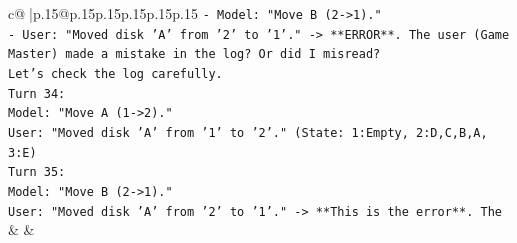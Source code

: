 \documentclass{article}
\begin{document}
{\begin{supertabular}{c@{$\;$}|p{.15\linewidth}@{}p{.15\linewidth}p{.15\linewidth}p{.15\linewidth}p{.15\linewidth}p{.15\linewidth}}
{{{\texttt{{-} Model: "Move B (2{-}>1)."} \\
\texttt{{-} User: "Moved disk 'A' from '2' to '1'." {-}> **ERROR**. The user (Game Master) made a mistake in the log? Or did I misread?} \\
\texttt{Let's check the log carefully.} \\
\texttt{Turn 34:} \\
\texttt{Model: "Move A (1{-}>2)."} \\
\texttt{User: "Moved disk 'A' from '1' to '2'." (State: 1:Empty, 2:D,C,B,A, 3:E)} \\
\texttt{Turn 35:} \\
\texttt{Model: "Move B (2{-}>1)."} \\
\texttt{User: "Moved disk 'A' from '2' to '1'." {-}> **This is the error**. The} \\
            }
        }
    }
    & & \\ \\


\end{supertabular}}
\end{document}
